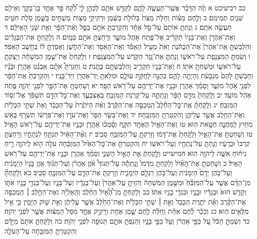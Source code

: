 \documentclass[twoside, openany, parskip=half, 11pt]{book}
\begin{document}
כב רביעיכט א וְזֶ֨ה הַדָּבָ֜ר אֲשֶֽׁר־תַּעֲשֶׂ֥ה לָהֶ֛ם לְקַדֵּ֥שׁ אֹתָ֖ם לְכַהֵ֣ן לִ֑י לְ֠קַ֠ח פַּ֣ר אֶחָ֧ד בֶּן־בָּקָ֛ר וְאֵילִ֥ם שְׁנַ֖יִם תְּמִימִֽם׃ ב וְלֶ֣חֶם מַצּ֗וֹת וְחַלֹּ֤ת מַצֹּת֙ בְּלוּלֹ֣ת בַּשֶּׁ֔מֶן וּרְקִיקֵ֥י מַצּ֖וֹת מְשֻׁחִ֣ים בַּשָּׁ֑מֶן סֹ֥לֶת חִטִּ֖ים תַּעֲשֶׂ֥ה אֹתָֽם׃ ג וְנָתַתָּ֤ אוֹתָם֙ עַל־סַ֣ל אֶחָ֔ד וְהִקְרַבְתָּ֥ אֹתָ֖ם בַּסָּ֑ל וְאֶ֨ת־הַפָּ֔ר וְאֵ֖ת שְׁנֵ֥י הָאֵילִֽם׃ ד וְאֶת־אַהֲרֹ֤ן וְאֶת־בָּנָיו֙ תַּקְרִ֔יב אֶל־פֶּ֖תַח אֹ֣הֶל מוֹעֵ֑ד וְרָחַצְתָּ֥ אֹתָ֖ם בַּמָּֽיִם׃ ה וְלָקַחְתָּ֣ אֶת־הַבְּגָדִ֗ים וְהִלְבַּשְׁתָּ֤ אֶֽת־אַהֲרֹן֙ אֶת־הַכֻּתֹּ֔נֶת וְאֵת֙ מְעִ֣יל הָאֵפֹ֔ד וְאֶת־הָאֵפֹ֖ד וְאֶת־הַחֹ֑שֶׁן וְאָפַדְתָּ֣ ל֔וֹ בְּחֵ֖שֶׁב הָאֵפֹֽד׃ ו וְשַׂמְתָּ֥ הַמִּצְנֶ֖פֶת עַל־רֹאשׁ֑וֹ וְנָתַתָּ֛ אֶת־נֵ֥זֶר הַקֹּ֖דֶשׁ עַל־הַמִּצְנָֽפֶת׃ ז וְלָֽקַחְתָּ֙ אֶת־שֶׁ֣מֶן הַמִּשְׁחָ֔ה וְיָצַקְתָּ֖ עַל־רֹאשׁ֑וֹ וּמָשַׁחְתָּ֖ אֹתֽוֹ׃ ח וְאֶת־בָּנָ֖יו תַּקְרִ֑יב וְהִלְבַּשְׁתָּ֖ם כֻּתֳּנֹֽת׃ ט וְחָגַרְתָּ֩ אֹתָ֨ם אַבְנֵ֜ט אַהֲרֹ֣ן וּבָנָ֗יו וְחָבַשְׁתָּ֤ לָהֶם֙ מִגְבָּעֹ֔ת וְהָיְתָ֥ה לָהֶ֛ם כְּהֻנָּ֖ה לְחֻקַּ֣ת עוֹלָ֑ם וּמִלֵּאתָ֥ יַֽד־אַהֲרֹ֖ן וְיַד־בָּנָֽיו׃ י וְהִקְרַבְתָּ֙ אֶת־הַפָּ֔ר לִפְנֵ֖י אֹ֣הֶל מוֹעֵ֑ד וְסָמַ֨ךְ אַהֲרֹ֧ן וּבָנָ֛יו אֶת־יְדֵיהֶ֖ם עַל־רֹ֥אשׁ הַפָּֽר׃ יא וְשָׁחַטְתָּ֥ אֶת־הַפָּ֖ר לִפְנֵ֣י יְהֹוָ֑ה פֶּ֖תַח אֹ֥הֶל מוֹעֵֽד׃ יב וְלָֽקַחְתָּ֙ מִדַּ֣ם הַפָּ֔ר וְנָתַתָּ֛ה עַל־קַרְנֹ֥ת הַמִּזְבֵּ֖חַ בְּאֶצְבָּעֶ֑ךָ וְאֶת־כׇּל־הַדָּ֣ם תִּשְׁפֹּ֔ךְ אֶל־יְס֖וֹד הַמִּזְבֵּֽחַ׃ יג וְלָֽקַחְתָּ֗ אֶֽת־כׇּל־הַחֵ֘לֶב֮ הַֽמְכַסֶּ֣ה אֶת־הַקֶּ֒רֶב֒ וְאֵ֗ת הַיֹּתֶ֙רֶת֙ עַל־הַכָּבֵ֔ד וְאֵת֙ שְׁתֵּ֣י הַכְּלָיֹ֔ת וְאֶת־הַחֵ֖לֶב אֲשֶׁ֣ר עֲלֵיהֶ֑ן וְהִקְטַרְתָּ֖ הַמִּזְבֵּֽחָה׃ יד וְאֶת־בְּשַׂ֤ר הַפָּר֙ וְאֶת־עֹר֣וֹ וְאֶת־פִּרְשׁ֔וֹ תִּשְׂרֹ֣ף בָּאֵ֔שׁ מִח֖וּץ לַֽמַּחֲנֶ֑ה חַטָּ֖את הֽוּא׃ טו וְאֶת־הָאַ֥יִל הָאֶחָ֖ד תִּקָּ֑ח וְסָ֨מְכ֜וּ אַהֲרֹ֧ן וּבָנָ֛יו אֶת־יְדֵיהֶ֖ם עַל־רֹ֥אשׁ הָאָֽיִל׃ טז וְשָׁחַטְתָּ֖ אֶת־הָאָ֑יִל וְלָֽקַחְתָּ֙ אֶת־דָּמ֔וֹ וְזָרַקְתָּ֥ עַל־הַמִּזְבֵּ֖חַ סָבִֽיב׃ יז וְאֶ֨ת־הָאַ֔יִל תְּנַתֵּ֖חַ לִנְתָחָ֑יו וְרָחַצְתָּ֤ קִרְבּוֹ֙ וּכְרָעָ֔יו וְנָתַתָּ֥ עַל־נְתָחָ֖יו וְעַל־רֹאשֽׁוֹ׃ יח וְהִקְטַרְתָּ֤ אֶת־כׇּל־הָאַ֙יִל֙ הַמִּזְבֵּ֔חָה עֹלָ֥ה ה֖וּא לַֽיהֹוָ֑ה רֵ֣יחַ נִיח֔וֹחַ אִשֶּׁ֥ה לַיהֹוָ֖ה הֽוּא׃ חמישייט וְלָ֣קַחְתָּ֔ אֵ֖ת הָאַ֣יִל הַשֵּׁנִ֑י וְסָמַ֨ךְ אַהֲרֹ֧ן וּבָנָ֛יו אֶת־יְדֵיהֶ֖ם עַל־רֹ֥אשׁ הָאָֽיִל׃ כ וְשָׁחַטְתָּ֣ אֶת־הָאַ֗יִל וְלָקַחְתָּ֤ מִדָּמוֹ֙ וְנָֽתַתָּ֡ה עַל־תְּנוּךְ֩ אֹ֨זֶן אַהֲרֹ֜ן וְעַל־תְּנ֨וּךְ אֹ֤זֶן בָּנָיו֙ הַיְמָנִ֔ית וְעַל־בֹּ֤הֶן יָדָם֙ הַיְמָנִ֔ית וְעַל־בֹּ֥הֶן רַגְלָ֖ם הַיְמָנִ֑ית וְזָרַקְתָּ֧ אֶת־הַדָּ֛ם עַל־הַמִּזְבֵּ֖חַ סָבִֽיב׃ כא וְלָקַחְתָּ֞ מִן־הַדָּ֨ם אֲשֶׁ֥ר עַֽל־הַמִּזְבֵּ֘חַ֮ וּמִשֶּׁ֣מֶן הַמִּשְׁחָה֒ וְהִזֵּיתָ֤ עַֽל־אַהֲרֹן֙ וְעַל־בְּגָדָ֔יו וְעַל־בָּנָ֛יו וְעַל־בִּגְדֵ֥י בָנָ֖יו אִתּ֑וֹ וְקָדַ֥שׁ הוּא֙ וּבְגָדָ֔יו וּבָנָ֛יו וּבִגְדֵ֥י בָנָ֖יו אִתּֽוֹ׃ כב וְלָקַחְתָּ֣ מִן־הָ֠אַ֠יִל הַחֵ֨לֶב וְהָֽאַלְיָ֜ה וְאֶת־הַחֵ֣לֶב ׀ הַֽמְכַסֶּ֣ה אֶת־הַקֶּ֗רֶב וְאֵ֨ת יֹתֶ֤רֶת הַכָּבֵד֙ וְאֵ֣ת ׀ שְׁתֵּ֣י הַכְּלָיֹ֗ת וְאֶת־הַחֵ֙לֶב֙ אֲשֶׁ֣ר עֲלֵיהֶ֔ן וְאֵ֖ת שׁ֣וֹק הַיָּמִ֑ין כִּ֛י אֵ֥יל מִלֻּאִ֖ים הֽוּא׃ כג וְכִכַּ֨ר לֶ֜חֶם אַחַ֗ת וְֽחַלַּ֨ת לֶ֥חֶם שֶׁ֛מֶן אַחַ֖ת וְרָקִ֣יק אֶחָ֑ד מִסַּל֙ הַמַּצּ֔וֹת אֲשֶׁ֖ר לִפְנֵ֥י יְהֹוָֽה׃ כד וְשַׂמְתָּ֣ הַכֹּ֔ל עַ֚ל כַּפֵּ֣י אַהֲרֹ֔ן וְעַ֖ל כַּפֵּ֣י בָנָ֑יו וְהֵנַפְתָּ֥ אֹתָ֛ם תְּנוּפָ֖ה לִפְנֵ֥י יְהֹוָֽה׃ כה וְלָקַחְתָּ֤ אֹתָם֙ מִיָּדָ֔ם וְהִקְטַרְתָּ֥ הַמִּזְבֵּ֖חָה עַל־הָעֹלָ֑ה 
\end{document}
